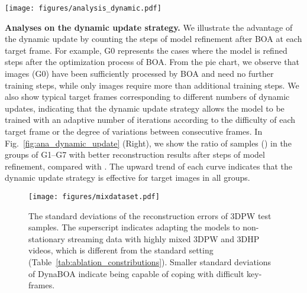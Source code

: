 \documentclass[10pt,journal,compsoc]{IEEEtran}
\let\MYoriglatexcaption\caption
\renewcommand{\caption}[2][\relax]{\MYoriglatexcaption[#2]{#2}}
\newcommand{\tab}[1]{Table~\ref{#1}}
\newcommand{\fig}[1]{Fig.~\ref{#1}}
\newcommand{\myparagraph}[1]{\vspace{5pt} \noindent \textbf{#1}}
\begin{document}
\begin{figure*}[t]
    \centering
    \texttt{[image: figures/analysis\_dynamic.pdf]}
    \vspace{-15pt}
    \caption{\textbf{Left:} The ratio of test frames with different steps of model refinement in the process of dynamic update and corresponding showcases from 3DPW. \textbf{Right:} The ratio of samples in the groups of G1--G7 with reconstruction results after  steps of model refinement.
    }
    \label{fig:ana_dynamic_update}
\end{figure*}

\myparagraph{Analyses on the dynamic update strategy.} 
We illustrate the advantage of the dynamic update by counting the steps of model refinement after BOA at each target frame. 
For example, G0 represents the cases where the model is refined  steps after the optimization process of BOA.
From the pie chart, we observe that  images (G0) have been sufficiently processed by BOA and need no further training steps, while only  images require more than  additional training steps.
We also show typical target frames corresponding to different numbers of dynamic updates, indicating that the dynamic update strategy allows the model to be trained with an adaptive number of iterations according to the difficulty of each target frame or the degree of variations between consecutive frames.
In \fig{fig:ana_dynamic_update} (Right), we show the ratio of samples () in the groups of G1--G7 with better reconstruction results after  steps of model refinement, compared with .
The upward trend of each curve indicates that the dynamic update strategy is effective for target images in all groups.








\begin{figure}[t]
    \centering
    \texttt{[image: figures/mixdataset.pdf]}
    \vspace{-15pt}
    \caption{The standard deviations of the reconstruction errors of 3DPW test samples. The superscript  indicates adapting the models to non-stationary streaming data with highly mixed 3DPW and 3DHP videos, which is different from the standard setting (\tab{tab:ablation_constributions}). Smaller standard deviations of DynaBOA indicate being capable of coping with difficult key-frames.
    }
    \label{fig:mixdataset}
\end{figure}
\end{document}
